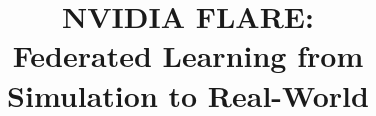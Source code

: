 \documentclass[11pt]{article}
\begin{document}
\title{NVIDIA FLARE:\\ Federated Learning from Simulation to Real-World}


%

\end{document}
